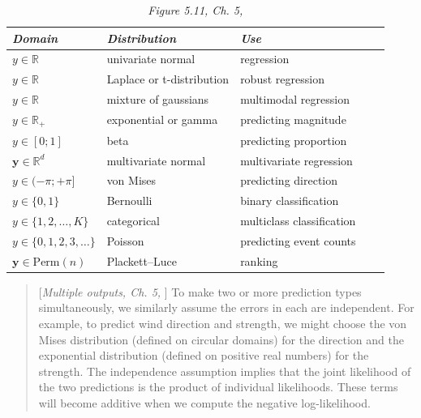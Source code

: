 \documentclass{myclass}
\numberwithin{equation}{subsection}
\begin{document}
\begin{table}[ht]
\centering
\begin{tabular}{*5l}
\toprule
\textit{Domain} & \textit{Distribution} & \textit{Use} \\
\midrule
\(y \in \mathbb{R}\)            & univariate normal         & regression                \\ 
\(y \in \mathbb{R}\)            & Laplace or t-distribution & robust regression         \\ 
\(y \in \mathbb{R}\)            & mixture of gaussians      & multimodal regression     \\ 
\(y \in \mathbb{R}_+\)          & exponential or gamma      & predicting magnitude      \\ 
\(y \in [0;1]\)                 & beta                      & predicting proportion     \\ 
\(\bm{y} \in \mathbb{R}^d\)     & multivariate normal       & multivariate regression   \\ 
\(y \in (-\pi; +\pi]\)          & von Mises                 & predicting direction      \\ 
\(y \in \{0,1\}\)               & Bernoulli                 & binary classification     \\ 
\(y \in \{1,2,\ldots, K\}\)     & categorical               & multiclass classification \\ 
\(y \in \{0,1,2,3,\ldots\}\)    & Poisson                   & predicting event counts   \\ 
\(\bm{y} \in \mathrm{Perm}(n)\) & Plackett--Luce            & ranking                   \\ 
\bottomrule
\hline
\end{tabular}
\caption{\textit{Figure 5.11, Ch. 5, \cite{prince2023understanding}}}
\end{table}


\begin{quote}[\textit{Multiple outputs, Ch. 5,} \cite{prince2023understanding}]
To make two or more prediction types simultaneously, we similarly assume the errors in each are
independent. For example, to predict wind direction and strength, we might choose the von Mises
distribution (defined on circular domains) for the direction and the exponential distribution
(defined on positive real numbers) for the strength. The independence assumption implies that the
joint likelihood of the two predictions is the product of individual likelihoods. These terms will
become additive when we compute the negative log-likelihood.
\end{quote}
\end{document}
